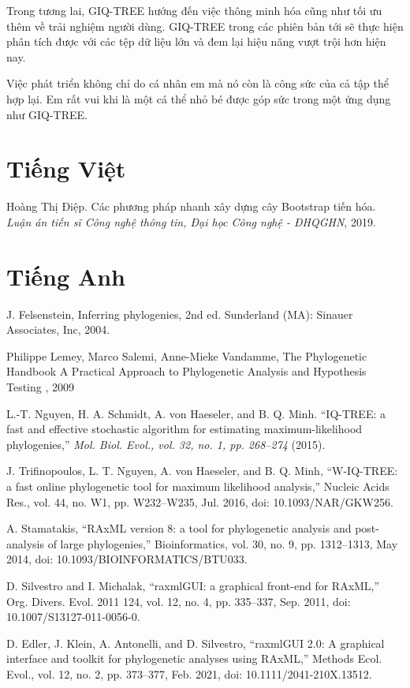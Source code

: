 \documentclass[12pt]{report}
\begin{document}
Trong tương lai, GIQ-TREE hướng đến việc thông minh hóa cũng như tối ưu thêm về trải nghiệm người dùng. GIQ-TREE trong các phiên bản tới sẽ thực hiện phân tích được với các tệp dữ liệu lớn và đem lại hiệu năng vượt trội hơn hiện nay.

Việc phát triển không chỉ do cá nhân em mà nó còn là công sức của cả tập thể hợp lại. Em rất vui khi là một cá thể nhỏ bé được góp sức trong một ứng dụng như GIQ-TREE.

\begin{thebibliography}{10}
\section*{Tiếng Việt}
	Hoàng Thị Điệp. Các phương pháp nhanh xây dựng cây Bootstrap tiến hóa. \textit{Luận án tiến sĩ Công nghệ thông tin, Đại học Công nghệ - ĐHQGHN}, 2019.
	
\section*{Tiếng Anh}
	J. Felsenstein, Inferring phylogenies, 2nd ed. Sunderland (MA): Sinauer Associates, Inc, 2004.
	
	Philippe Lemey, Marco Salemi, Anne-Mieke Vandamme, The Phylogenetic Handbook A Practical Approach to Phylogenetic Analysis and Hypothesis Testing , 2009

	L.-T. Nguyen, H. A. Schmidt, A. von Haeseler, and B. Q. Minh.
	“IQ-TREE: a fast and effective stochastic algorithm for estimating maximum-likelihood phylogenies,” \textit{Mol. Biol. Evol., vol. 32, no. 1, pp. 268–274} (2015).
	
	J. Trifinopoulos, L. T. Nguyen, A. von Haeseler, and B. Q. Minh, “W-IQ-TREE: a fast online phylogenetic tool for maximum likelihood analysis,” Nucleic Acids Res., vol. 44, no. W1, pp. W232–W235, Jul. 2016, doi: 10.1093/NAR/GKW256.
	
	A. Stamatakis, “RAxML version 8: a tool for phylogenetic analysis and post-analysis of large phylogenies,” Bioinformatics, vol. 30, no. 9, pp. 1312–1313, May 2014, doi: 10.1093/BIOINFORMATICS/BTU033.
	
	D. Silvestro and I. Michalak, “raxmlGUI: a graphical front-end for RAxML,” Org. Divers. Evol. 2011 124, vol. 12, no. 4, pp. 335–337, Sep. 2011, doi: 10.1007/S13127-011-0056-0.
	
	D. Edler, J. Klein, A. Antonelli, and D. Silvestro, “raxmlGUI 2.0: A graphical interface and toolkit for phylogenetic analyses using RAxML,” Methods Ecol. Evol., vol. 12, no. 2, pp. 373–377, Feb. 2021, doi: 10.1111/2041-210X.13512.
	

\end{thebibliography}
\end{document}

